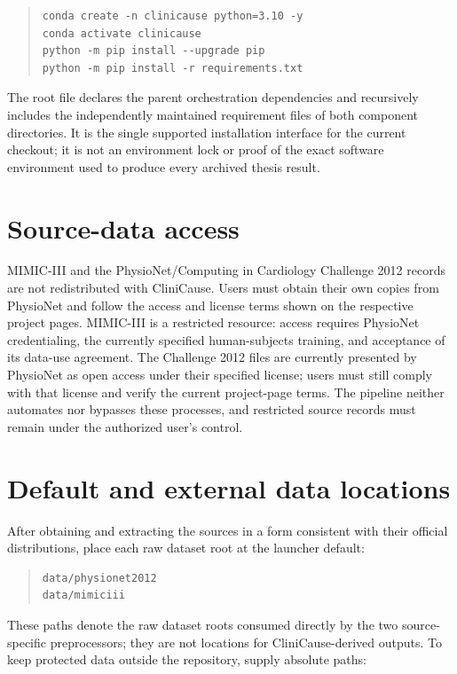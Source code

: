 \begin{quote}\small
\begin{verbatim}
conda create -n clinicause python=3.10 -y
conda activate clinicause
python -m pip install --upgrade pip
python -m pip install -r requirements.txt
\end{verbatim}
\end{quote}

The root file declares the parent orchestration dependencies and recursively
includes the independently maintained requirement files of both component
directories.
It is the single supported installation interface for the current checkout;
it is not an environment lock or proof of the exact software environment used
to produce every archived thesis result.

\section{Source-data access}

MIMIC-III and the PhysioNet/Computing in Cardiology Challenge 2012 records are
not redistributed with CliniCause. Users must obtain their own copies from
PhysioNet and follow the access and license terms shown on the respective
project pages. MIMIC-III is a restricted resource: access requires PhysioNet
credentialing, the currently specified human-subjects training, and acceptance
of its data-use agreement. The Challenge 2012 files are currently presented
by PhysioNet as open access under their specified license; users must still
comply with that license and verify the current project-page terms. The
pipeline neither automates nor bypasses these processes, and restricted source
records must remain under the authorized user's control.

\section{Default and external data locations}

After obtaining and extracting the sources in a form consistent with their
official distributions, place each raw dataset root at the launcher default:

\begin{quote}\small
\begin{verbatim}
data/physionet2012
data/mimiciii
\end{verbatim}
\end{quote}

These paths denote the raw dataset roots consumed directly by the two
source-specific preprocessors; they are not locations for CliniCause-derived
outputs. To keep protected data outside the repository, supply absolute paths:

